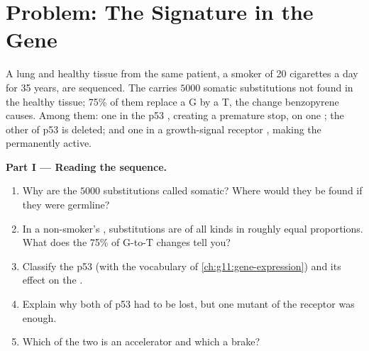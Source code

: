 \section{Problem: The Signature in the Gene}

\begin{problem}
\label{pb:g11:cancer:1}
A lung  and healthy tissue from the same patient, a smoker of 20
cigarettes a day for 35 years, are sequenced. The  carries
$\num{5000}$ somatic substitutions not found in the healthy tissue;
75\% of them replace a G by a T, the change benzopyrene causes. Among
them: one in the p53 , creating a premature stop, on one ;
the other  of p53 is deleted; and one in a growth-signal
receptor , making the  permanently active.

\medskip
\noindent\textbf{Part I --- Reading the sequence.}
\begin{enumerate}
  \item Why are the $\num{5000}$ substitutions called somatic? Where
        would they be found if they were germline?
  \item In a non-smoker's , substitutions are of all kinds in
        roughly equal proportions. What does the 75\% of G-to-T
        changes tell you?
  \item Classify the p53  (with the vocabulary of
        \cref{ch:g11:gene-expression}) and its effect on the .
  \item Explain why both  of p53 had to be lost, but one
        mutant  of the receptor  was enough.
  \item Which of the two  is an accelerator and which a brake?
\end{enumerate}


\end{problem}
